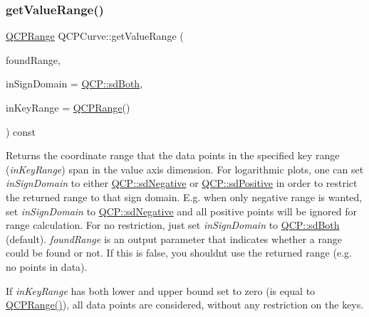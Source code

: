 \subsubsection{\texorpdfstring{get\+Value\+Range()}{getValueRange()}}
{\footnotesize\ttfamily \mbox{\hyperlink{class_q_c_p_range}{Q\+C\+P\+Range}} Q\+C\+P\+Curve\+::get\+Value\+Range (\begin{DoxyParamCaption}\item[{bool \&}]{found\+Range,  }\item[{\mbox{\hyperlink{namespace_q_c_p_afd50e7cf431af385614987d8553ff8a9}{Q\+C\+P\+::\+Sign\+Domain}}}]{in\+Sign\+Domain = {\ttfamily \mbox{\hyperlink{namespace_q_c_p_afd50e7cf431af385614987d8553ff8a9aa38352ef02d51ddfa4399d9551566e24}{Q\+C\+P\+::sd\+Both}}},  }\item[{const \mbox{\hyperlink{class_q_c_p_range}{Q\+C\+P\+Range}} \&}]{in\+Key\+Range = {\ttfamily \mbox{\hyperlink{class_q_c_p_range}{Q\+C\+P\+Range}}()} }\end{DoxyParamCaption}) const\hspace{0.3cm}{\ttfamily [virtual]}}

Returns the coordinate range that the data points in the specified key range ({\itshape in\+Key\+Range}) span in the value axis dimension. For logarithmic plots, one can set {\itshape in\+Sign\+Domain} to either \mbox{\hyperlink{namespace_q_c_p_afd50e7cf431af385614987d8553ff8a9a2d18af0bc58f6528d1e82ce699fe4829}{Q\+C\+P\+::sd\+Negative}} or \mbox{\hyperlink{namespace_q_c_p_afd50e7cf431af385614987d8553ff8a9a584784b75fb816abcc627cf743bb699f}{Q\+C\+P\+::sd\+Positive}} in order to restrict the returned range to that sign domain. E.\+g. when only negative range is wanted, set {\itshape in\+Sign\+Domain} to \mbox{\hyperlink{namespace_q_c_p_afd50e7cf431af385614987d8553ff8a9a2d18af0bc58f6528d1e82ce699fe4829}{Q\+C\+P\+::sd\+Negative}} and all positive points will be ignored for range calculation. For no restriction, just set {\itshape in\+Sign\+Domain} to \mbox{\hyperlink{namespace_q_c_p_afd50e7cf431af385614987d8553ff8a9aa38352ef02d51ddfa4399d9551566e24}{Q\+C\+P\+::sd\+Both}} (default). {\itshape found\+Range} is an output parameter that indicates whether a range could be found or not. If this is false, you shouldn\textquotesingle{}t use the returned range (e.\+g. no points in data).

If {\itshape in\+Key\+Range} has both lower and upper bound set to zero (is equal to {\ttfamily \mbox{\hyperlink{class_q_c_p_range}{Q\+C\+P\+Range()}}}), all data points are considered, without any restriction on the keys.

